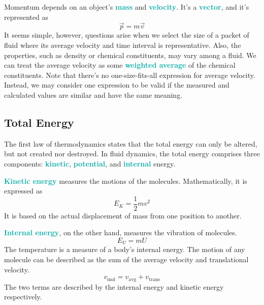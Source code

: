 \documentclass[twoside]{article}
\newcommand{\highlightbluetext}[1]{\textcolor[HTML]{09ACA6}{\textbf{#1}}}
\numberwithin{equation}{section}
\begin{document}
	Momentum depends on an object's \highlightbluetext{mass} and \highlightbluetext{velocity}. It's a \highlightbluetext{vector}, and it's represented as
	\begin{equation}
		\vec{p} = m \vec{v}
		\label{eq:Momentum}
	\end{equation}
	It seems simple, however, questions arise when we select the size of a packet of fluid where its average velocity and time interval is representative. Also, the properties, such as density or chemical constituents, may vary among a fluid. We can treat the average velocity as some \highlightbluetext{weighted average} of the chemical constituents. Note that there's no one-size-fits-all expression for average velocity. Instead, we may consider one expression to be valid if the measured and calculated values are similar and have the same meaning.
	
	\subsection{Total Energy}
	\label{subsec:TotalEnergy}
	
	The first law of thermodynamics states that the total energy can only be altered, but not created nor destroyed. In fluid dynamics, the total energy comprises three components: \highlightbluetext{kinetic}, \highlightbluetext{potential}, and \highlightbluetext{internal} energy.
	
	\highlightbluetext{Kinetic energy} measures the motions of the molecules. Mathematically, it is expressed as
	\begin{equation}
		E_K = \frac{1}{2} mv^2
		\label{eq:KineticEnergy}
	\end{equation}
	It is based on the actual displacement of mass from one position to another.
	
	\highlightbluetext{Internal energy}, on the other hand, measures the vibration of molecules.
	\begin{equation}
		E_U = mU
		\label{eq:InternalEnergy}
	\end{equation}
	The temperature is a measure of a body's internal energy. The motion of any molecule can be described as the sum of the average velocity and translational velocity.
	\begin{equation}
		v_{\text{mol}} = v_{\text{avg}}+v_{\text{trans}}
		\label{eq:AvgTransVelocity}
	\end{equation}
	The two terms are described by the internal energy and kinetic energy respectively.
	
\end{document}
